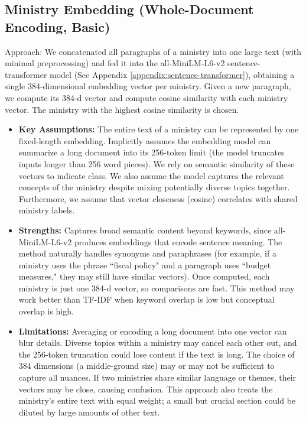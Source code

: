 \documentclass{report}
\begin{document}
\subsection{Ministry Embedding (Whole-Document Encoding, Basic)}
Approach: We concatenated all paragraphs of a ministry into one large text (with minimal preprocessing) and fed it into the all-MiniLM-L6-v2 sentence-transformer model (See Appendix \ref{appendix:sentence-transformer}), obtaining a single 384-dimensional embedding vector per ministry. Given a new paragraph, we compute its 384-d vector and compute cosine similarity with each ministry vector. The ministry with the highest cosine similarity is chosen.

\begin{itemize}
    \item \textbf{Key Assumptions:} The entire text of a ministry can be represented by one fixed-length embedding. Implicitly assumes the embedding model can summarize a long document into its 256-token limit (the model truncates inputs longer than 256 word pieces). We rely on semantic similarity of these vectors to indicate class. We also assume the model captures the relevant concepts of the ministry despite mixing potentially diverse topics together. Furthermore, we assume that vector closeness (cosine) correlates with shared ministry labels.
    \item \textbf{Strengths:} Captures broad semantic content beyond keywords, since all-MiniLM-L6-v2 produces embeddings that encode sentence meaning. The method naturally handles synonyms and paraphrases (for example, if a ministry uses the phrase ``fiscal policy" and a paragraph uses ``budget measures," they may still have similar vectors). Once computed, each ministry is just one 384-d vector, so comparisons are fast. This method may work better than TF-IDF when keyword overlap is low but conceptual overlap is high.
    \item \textbf{Limitations:} Averaging or encoding a long document into one vector can blur details. Diverse topics within a ministry may cancel each other out, and the 256-token truncation could lose content if the text is long. The choice of 384 dimensions (a middle-ground size) may or may not be sufficient to capture all nuances. If two ministries share similar language or themes, their vectors may be close, causing confusion. This approach also treats the ministry's entire text with equal weight; a small but crucial section could be diluted by large amounts of other text.
\end{itemize}
\end{document}

